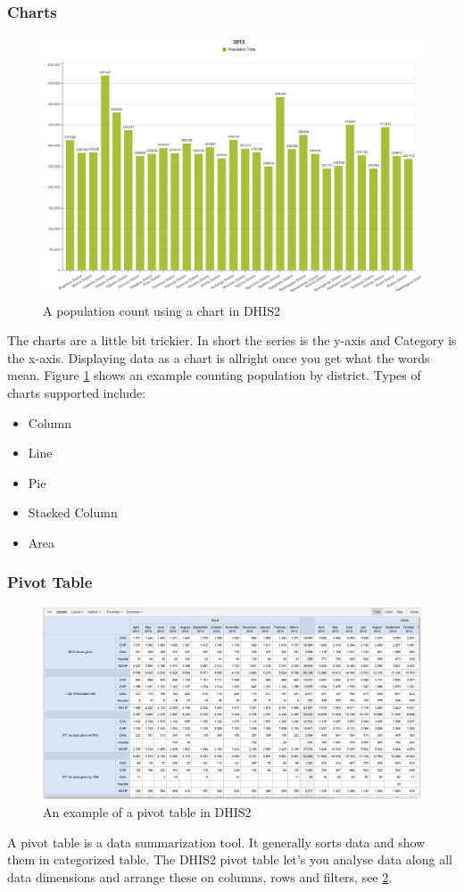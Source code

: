 \begin{description}
\subsubsection{Charts}
\begin{figure}
\centering
\includegraphics[width=12cm]{empirical/images/chart_rwanda_population_2013}
\caption{A population count using a chart in DHIS2}
\label{fig:a_population_count_using_a_chart_in_dhis2}
\end{figure}
The charts are a little bit trickier. In short the series is the y-axis and Category is the x-axis. Displaying data as a chart is allright once you get what the words mean.
Figure \ref{fig:a_population_count_using_a_chart_in_dhis2} shows an example counting population by district. Types of charts supported include:
\begin{itemize}
\item Column
\item Line
\item Pie
\item Stacked Column
\item Area
\end{itemize}
\cite{10}
\subsubsection{Pivot Table}
\begin{figure}
\centering
\includegraphics[width=12cm]{empirical/images/pivot_table_example}
\caption{An example of a pivot table in DHIS2\cite{10}}
\label{an_example_of_a_pivot_table_in_dhis2}
\end{figure}
A pivot table is a data summarization tool. It generally sorts data and show them in categorized table.
The DHIS2 pivot table let's you analyse data along all data dimensions and arrange these on columns, rows and filters, see \ref{an_example_of_a_pivot_table_in_dhis2}.

\end{description}
